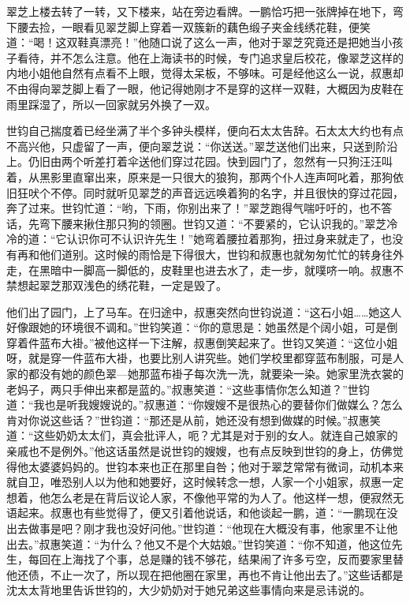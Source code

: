 \par 翠芝上楼去转了一转，又下楼来，站在旁边看牌。一鹏恰巧把一张牌掉在地下，弯下腰去捡，一眼看见翠芝脚上穿着一双簇新的藕色缎子夹金线绣花鞋，便笑道：“喝！这双鞋真漂亮！”他随口说了这么一声，他对于翠芝究竟还是把她当小孩子看待，并不怎么注意。他在上海读书的时候，专门追求皇后校花，像翠芝这样的内地小姐他自然有点看不上眼，觉得太呆板，不够味。可是经他这么一说，叔惠却不由得向翠芝脚上看了一眼，他记得她刚才不是穿的这样一双鞋，大概因为皮鞋在雨里踩湿了，所以一回家就另外换了一双。
\par 世钧自己揣度着已经坐满了半个多钟头模样，便向石太太告辞。石太太大约也有点不高兴他，只虚留了一声，便向翠芝说：“你送送。”翠芝送他们出来，只送到阶沿上。仍旧由两个听差打着伞送他们穿过花园。快到园门了，忽然有一只狗汪汪叫着，从黑影里直窜出来，原来是一只很大的狼狗，那两个仆人连声呵叱着，那狗依旧狂吠个不停。同时就听见翠芝的声音远远唤着狗的名字，并且很快的穿过花园，奔了过来。世钧忙道：“哟，下雨，你别出来了！”翠芝跑得气喘吁吁的，也不答话，先弯下腰来揪住那只狗的领圈。世钧又道：“不要紧的，它认识我的。”翠芝冷冷的道：“它认识你可不认识许先生！”她弯着腰拉着那狗，扭过身来就走了，也没有再和他们道别。这时候的雨恰是下得很大，世钧和叔惠也就匆匆忙忙的转身往外走，在黑暗中一脚高一脚低的，皮鞋里也进去水了，走一步，就噗哜一响。叔惠不禁想起翠芝那双浅色的绣花鞋，一定是毁了。
\par 他们出了园门，上了马车。在归途中，叔惠突然向世钧说道：“这石小姐……她这人好像跟她的环境很不调和。”世钧笑道：“你的意思是：她虽然是个阔小姐，可是倒穿着件蓝布大褂。”被他这样一下注解，叔惠倒笑起来了。世钧又笑道：“这位小姐呀，就是穿一件蓝布大褂，也要比别人讲究些。她们学校里都穿蓝布制服，可是人家的都没有她的颜色翠—她那蓝布褂子每次洗一洗，就要染一染。她家里洗衣裳的老妈子，两只手伸出来都是蓝的。”叔惠笑道：“这些事情你怎么知道？”世钧道：“我也是听我嫂嫂说的。”叔惠道：“你嫂嫂不是很热心的要替你们做媒么？怎么肯对你说这些话？”世钧道：“那还是从前，她还没有想到做媒的时候。”叔惠笑道：“这些奶奶太太们，真会批评人，呃？尤其是对于别的女人。就连自己娘家的亲戚也不是例外。”他这话虽然是说世钧的嫂嫂，也有点反映到世钧的身上，仿佛觉得他太婆婆妈妈的。世钧本来也正在那里自咎；他对于翠芝常常有微词，动机本来就自卫，唯恐别人以为他和她要好，这时候转念一想，人家一个小姐家，叔惠一定想着，他怎么老是在背后议论人家，不像他平常的为人了。他这样一想，便寂然无语起来。叔惠也有些觉得了，便又引着他说话，和他谈起一鹏，道：“一鹏现在没出去做事是吧？刚才我也没好问他。”世钧道：“他现在大概没有事，他家里不让他出去。”叔惠笑道：“为什么？他又不是个大姑娘。”世钧笑道：“你不知道，他这位先生，每回在上海找了个事，总是赚的钱不够花，结果闹了许多亏空，反而要家里替他还债，不止一次了，所以现在把他圈在家里，再也不肯让他出去了。”这些话都是沈太太背地里告诉世钧的，大少奶奶对于她兄弟这些事情向来是忌讳说的。
